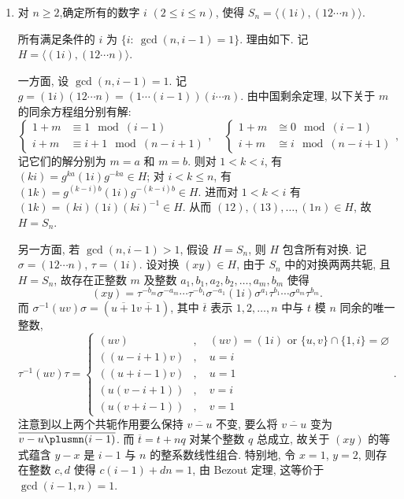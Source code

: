 \begin{enumerate}
\item 对 $n \geqslant 2$,确定所有的数字 $i$ $(2 \leqslant i \leqslant n)$,
使得 $S_n=\langle(1 i),(12 \cdots n)\rangle$.
\begin{solution}
    所有满足条件的 $i$ 为 $\{i:\ \gcd(n,i-1)=1\}$. 理由如下.
    记 $H=\langle(1 i),(12 \cdots n)\rangle$. 

    一方面, 设 $\gcd(n,i-1)=1$.
    记 $g=(1i)(12 \cdots n)=(1\cdots (i-1))(i\cdots n)$.
    由中国剩余定理, 以下关于 $m$ 的同余方程组分别有解:
    $$\left\{\begin{aligned}
        1+m &\equiv 1 \mod (i-1)\\
        i+m &\equiv i+1 \mod (n-i+1)
    \end{aligned}\right.,
    \quad
    \left\{\begin{aligned}
        1+m &\cong 0 \mod (i-1)\\
        i+m &\cong i \mod (n-i+1)
    \end{aligned}\right.,$$
    记它们的解分别为 $m=a$ 和 $m=b$.
    则对 $1<k<i$, 有 $(ki)=g^{ka}(1i)g^{-ka}\in H$;
    对 $i<k \leqslant n$, 有 $(1k)=g^{(k-i)b}(1i)g^{-(k-i)b} \in H$.
    进而对 $1<k<i$ 有 $(1k)=(ki)(1i)(ki)^{-1} \in H$.
    从而 $(12),(13),\dots,(1n)\in H$, 故 $H=S_n$.

    另一方面, 若 $\gcd(n,i-1)>1$,
    假设 $H=S_n$, 则 $H$ 包含所有对换.
    记 $\sigma=(12\cdots n)$, $\tau=(1i)$.
    设对换 $(xy)\in H$,
    由于 $S_n$ 中的对换两两共轭, 且 $H=S_n$,
    故存在正整数 $m$ 及整数 $a_1,b_1,a_2,b_2,\dots,a_m,b_m$ 使得
    $$(xy)=\tau^{-b_m}\sigma^{-a_m}\cdots\tau^{-b_1}\sigma^{-a_1}(1i)\sigma^{a_1}\tau^{b_1}\cdots\sigma^{a_m}\tau^{b_m}.$$
    而 $\sigma^{-1}(uv)\sigma=(\overline{u+1}\overline{v+1})$,
    其中 $\overline{t}$ 表示 $1,2,\dots,n$ 中与 $t$ 模 $n$ 同余的唯一整数,
    $$\tau^{-1}(uv)\tau=\left\{\begin{aligned}
        (uv)&,\quad (uv)=(1i) \text{ or } \{u,v\}\cap \{1,i\}=\varnothing\\
        ((u-i+1)v)&,\quad u=i \\
        ((u+i-1)v)&,\quad u=1 \\
        (u(v-i+1))&,\quad v=i \\
        (u(v+i-1))&,\quad v=1
    \end{aligned}\right..$$
    注意到以上两个共轭作用要么保持 $\overline{v-u}$ 不变,
    要么将 $\overline{v-u}$ 变为 $\overline{v-u\plusmn(i-1)}$.
    而 $\overline{t}=t+nq$ 对某个整数 $q$ 总成立,
    故关于 $(xy)$ 的等式蕴含 $y-x$ 是 $i-1$ 与 $n$ 的整系数线性组合.
    特别地, 令 $x=1$, $y=2$, 则存在整数 $c,d$ 使得 $c(i-1)+dn=1$,
    由 Bezout 定理, 这等价于 $\gcd(i-1,n)=1$. 
\end{solution}


\end{enumerate}
